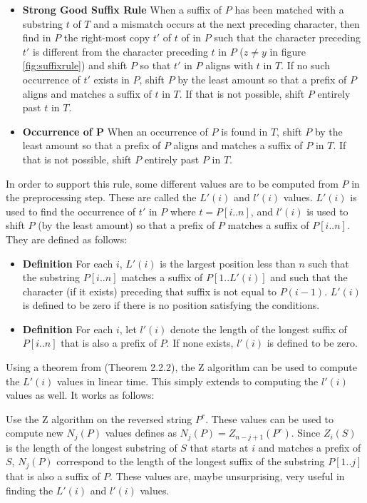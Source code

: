 \begin{itemize}
    \item[] \textbf{Strong Good Suffix Rule} When a suffix of $P$ has been matched with a substring $t$ of $T$ and a mismatch occurs at the next preceding character, then find in $P$ the right-most copy $t'$ of $t$ of in $P$ such that the character preceding $t'$ is different from the character preceding $t$ in $P$ ($z\neq y$ in figure \ref{fig:suffixrule}) and shift $P$ so that $t'$ in $P$ aligns with $t$ in $T$. If no such occurrence of $t'$ exists in $P$, shift $P$ by the least amount so that a prefix of $P$ aligns and matches a suffix of $t$ in $T$. If that is not possible, shift $P$ entirely past $t$ in $T$. 
    \item[] \textbf{Occurrence of P} When an occurrence of $P$ is found in $T$, shift $P$ by the least amount so that a prefix of $P$ aligns and matches a suffix of $P$ in $T$. If that is not possible, shift $P$ entirely past $P$ in $T$. 
\end{itemize}

In order to support this rule, some different values are to be computed from $P$ in the preprocessing step. These are called the $L'(i)$ and $l'(i)$ values. $L'(i)$ is used to find the occurrence of $t'$ in $P$ where $t=P[i..n]$, and $l'(i)$ is used to shift $P$ (by the least amount) so that a prefix of $P$ matches a suffix of $P[i..n]$. They are defined as follows:

\begin{itemize}
    \item[] \textbf{Definition} For each $i$, $L'(i)$ is the largest position less than $n$ such that the substring $P[i..n]$ matches a suffix of $P[1..L'(i)]$ and such that the character (if it exists) preceding that suffix is not equal to $P(i-1)$. $L'(i)$ is defined to be zero if there is no position satisfying the conditions. 
    \item[] \textbf{Definition} For each $i$, let $l'(i)$ denote the length of the longest suffix of $P[i..n]$ that is also a prefix of $P$. If none exists, $l'(i)$ is defined to be zero. 
\end{itemize}

Using a theorem from \cite{Gusfield1997AlgorithmsOS} (Theorem 2.2.2), the Z algorithm can be used to compute the $L'(i)$ values in linear time. This simply extends to computing the $l'(i)$ values as well. It works as follows:

Use the Z algorithm on the reversed string $P^r$. These values can be used to compute new $N_j(P)$ values defines as $N_j(P)=Z_{n-j+1}(P^r)$. Since $Z_i(S)$ is the length of the longest substring of $S$ that starts at $i$ and matches a prefix of $S$, $N_j(P)$ correspond to the length of the longest suffix of the substring $P[1..j]$ that is also a suffix of $P$. These values are, maybe unsurprising, very useful in finding the $L'(i)$ and $l'(i)$ values. 

